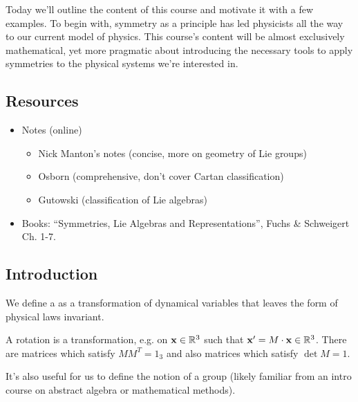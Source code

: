 Today we'll outline the content of this course and motivate it with a few examples. To begin with, symmetry as a principle has led physicists all the way to our current model of physics. This course's content will be almost exclusively mathematical, yet more pragmatic about introducing the necessary tools to apply symmetries to the physical systems we're interested in.

\subsection*{Resources}
\begin{itemize}
    \item Notes (online)
    \begin{itemize}
        \item Nick Manton's notes (concise, more on geometry of Lie groups)
        \item Osborn (comprehensive, don't cover Cartan classification)
        \item Gutowski (classification of Lie algebras)
    \end{itemize}
    \item Books: ``Symmetries, Lie Algebras and Representations'', Fuchs \& Schweigert Ch. 1-7.
\end{itemize}

\subsection*{Introduction}
\begin{defn}
We define a  as a transformation of dynamical variables that leaves the form of physical laws invariant.
\end{defn}
\begin{exm}
A rotation is a transformation, e.g. on $\boldsymbol{\mathbf{x}}\in \mathbb{R}^3$ such that $\boldsymbol{\mathbf{x}}'=M\cdot \boldsymbol{\mathbf{x}} \in \mathbb{R}^3$. There are  matrices which satisfy $MM^T = 1_3$ and also  matrices which satisfy $\det M = 1$.
\end{exm}

It's also useful for us to define the notion of a group (likely familiar from an intro course on abstract algebra or mathematical methods).

